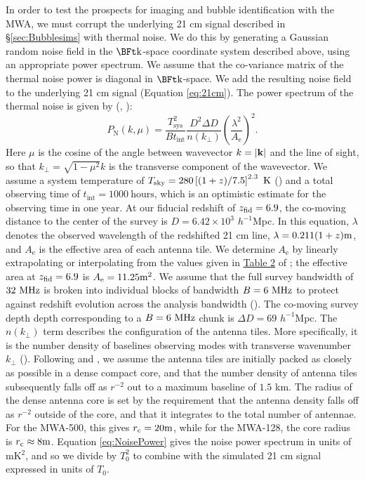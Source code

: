 In order to test the prospects for imaging and bubble identification with
the MWA, we must corrupt the underlying 21 cm signal described in \S \ref{sec:Bubblesims}
with thermal noise. We do this by generating a Gaussian random noise field in
the $\k$-space coordinate system described above, using an appropriate power spectrum. We assume that
the co-variance matrix of the thermal noise power is diagonal in $\k$-space. We add
the resulting noise field to the underlying 21 cm signal (Equation \ref{eq:21cm}).
The power spectrum of the thermal noise is given by (\citealt{McQuinn2006}, \citealt{Furlanetto2006}):
\begin{equation}
P_{\text{N}}(k,\mu) =
\frac{T_{\text{sys}}^2}{Bt_{\text{int}}}\frac{D^2\Delta
  D}{n(k_\perp)}\left( \frac{\lambda^2}{A_{\text{e}}}
\right)^{2}. \label{eq:NoisePower}
\end{equation}
Here $\mu$ is the cosine of the angle between wavevector $k = |{\bf
  k}|$ and the line of sight, so that $k_{\perp} = \sqrt{1-\mu^2} k$ is the transverse component of the wavevector. We 
assume a system temperature of $T_{\text{sky}} = 280
\left[(1+z)/7.5\right]^{2.3}\kelvin$ (\citealt{Wyithe:2007if}) and a total
observing time of $t_{\text{int}} = 1000\ \text{hours}$, which is an optimistic
estimate for the observing time in one year. At our fiducial redshift of $z_{\rm fid} = 6.9$, the co-moving
distance to the
center of the survey is $D = 6.42 \times 10^3$ $h^{-1}$Mpc. In this equation, $\lambda$ denotes
the observed wavelength of the redshifted 21 cm line,
$\lambda = 0.211(1+z) \meter$, and $A_{\text{e}}$ is the effective area of
each antenna tile. We determine $A_{\text{e}}$ by linearly extrapolating
or interpolating from the values given in
\href{http://iopscience.iop.org/0004-637X/661/1/1/fulltext/64283.tb2.html}{Table
  2} of \citet{Bowman:2005hj}; the effective area at $z_{\rm fid} = 6.9$ is
$A_{\text{e}}=11.25 \meter^2$. We assume that the full survey bandwidth of
$32 \MHz$ is broken into individual blocks of bandwidth $B = 6 \MHz$ to protect
against redshift evolution across the analysis bandwidth (\citealt{McQuinn:2005hk}). The co-moving survey depth depth corresponding to a $B= 6 \MHz$ chunk is $\Delta D = 69$ $h^{-1}$Mpc.
The $n(k_\perp)$ term describes the configuration of the antenna tiles. More specifically,
it is the number density of baselines observing modes with transverse wavenumber
$k_{\perp}$ (\citealt{McQuinn:2005hk}). Following \citet{Bowman:2005cr} and \citet{McQuinn:2005hk},
we assume the antenna tiles are initially packed as closely as possible in a
dense compact core, and that the number density of antenna tiles subsequently falls off
as $r^{-2}$ out to a
maximum baseline of $1.5$ km. The radius of the dense antenna core
is set  by the requirement that the antenna density falls off as
$r^{-2}$ outside of the core, and that it integrates to the total
number of antennae. For the MWA-500, this gives $r_{\text{c}}
= 20 \meter$, while for the MWA-128, the core radius is $r_{\text{c}}
\approx 8 \meter$. Equation \ref{eq:NoisePower} gives the noise power spectrum in
units of mK$^2$, and so we divide by $T_0^2$ to combine with the simulated 21 cm signal expressed
in units of $T_0$.

